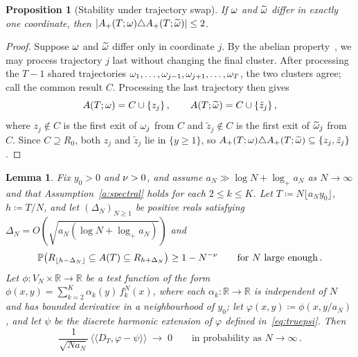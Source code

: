 \documentclass[11pt,a4paper,reqno]{amsart}
\newtheorem{Lemma}[Theorem]{Lemma}
\newtheorem{Proposition}[Theorem]{Proposition}
\theoremstyle{definition}
\newcommand{\bbP}{{\ensuremath{\mathbb P}} }
\newcommand{\bbR}{{\ensuremath{\mathbb R}} }
\newcommand{\laa}{\langle \! \langle}
\newcommand{\raa}{\rangle \! \rangle}
\let\a=\alpha \let\b=\beta   \let\d=\delta  \let\e=\varepsilon
\begin{document}
\begin{Proposition}[Stability under trajectory swap]\label{pr:exchange}
If\/ $\omega$ and $\widetilde{\omega}$ differ in exactly one coordinate,
then $|A_+(T;\omega)\triangle A_+(T;\widetilde{\omega})|\leq 2$.
\end{Proposition}

\begin{proof}
Suppose $\omega$ and $\widetilde{\omega}$ differ only in coordinate $j$. By the abelian property~\cite{diaconis1991growth}, we may process trajectory $j$ last without changing the final cluster. After processing the $T - 1$ shared trajectories $\omega_1, \ldots, \omega_{j-1}, \omega_{j+1}, \ldots, \omega_T$, the two clusters agree; call the common result $C$. Processing the last trajectory then gives
	\[ A(T;\omega) = C \cup \{z_j\}\,, \qquad A(T;\widetilde{\omega}) = C \cup \{\tilde z_j\}\,, \]
where $z_j \notin C$ is the first exit of $\omega_j$ from $C$ and $\tilde z_j \notin C$ is the first exit of $\widetilde{\omega}_j$ from $C$. Since $C \supseteq R_0$, both $z_j$ and $\tilde z_j$ lie in $\{y \geq 1\}$, so $A_+(T;\omega) \triangle A_+(T;\widetilde{\omega}) \subseteq \{z_j, \tilde z_j\}$.
\end{proof}

\begin{Lemma}\label{le:replace}
Fix $y_0 > 0$ and $\nu > 0$, and assume $a_N \gg \log N + \log_+ a_N$ as $N \to \infty$ and that Assumption~\ref{a:spectral} holds for each $2 \leq k \leq K$. Let $T \coloneqq N \lfloor a_N y_0\rfloor$, $h \coloneqq T/N$, and let $(\Delta_N)_{N \geq 1}$ be positive reals satisfying $\Delta_N = O\!\left(\sqrt{a_N(\log N + \log_+ a_N)}\right)$ and
	\[ \bbP\big(R_{\lfloor h - \Delta_N\rfloor} \subseteq A(T) \subseteq R_{h + \Delta_N}\big) \geq 1 - N^{-\n} \qquad \text{for } N \text{ large enough}\,. \]
Let $\phi : V_N \times \bbR \to \bbR$ be a test function of the form $\phi(x, y) = \sum_{k=2}^K \a_k(y)\, f_k^N(x)$, where each $\a_k : \bbR \to \bbR$ is independent of $N$ and has bounded derivative in a neighbourhood of $y_0$; let $\varphi(x, y) \coloneqq \phi(x, y/a_N)$, and let $\psi$ be the discrete harmonic extension of $\varphi$ defined in~\eqref{eq:truepsi}. Then
	\[ \frac{1}{\sqrt{Na_N}}\,\laa D_T, \varphi - \psi\raa \;\longrightarrow\; 0 \qquad \text{in probability as } N \to \infty\,. \]
\end{Lemma}
\end{document}
